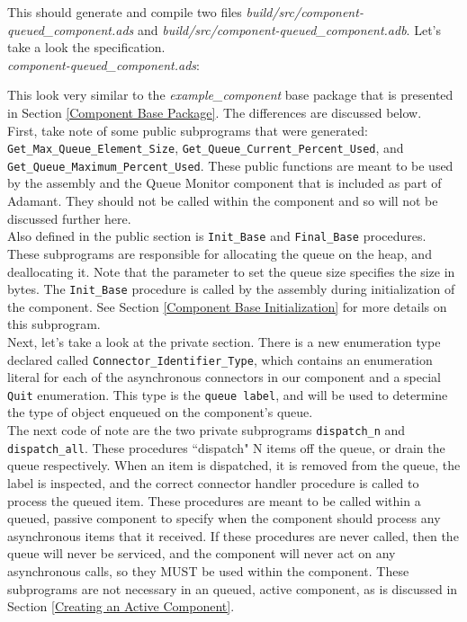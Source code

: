 This should generate and compile two files \textit{build/src/component-queued\_component.ads} and \textit{build/src/component-queued\_component.adb}. Let's take a look the specification. \\

\textit{component-queued\_component.ads}:

This look very similar to the \textit{example\_component} base package that is presented in Section \ref{Component Base Package}. The differences are discussed below. \\

First, take note of some public subprograms that were generated: \texttt{Get\_Max\_Queue\_Element\_Size}, \texttt{Get\_Queue\_Current\_Percent\_Used}, and \texttt{Get\_Queue\_Maximum\_Percent\_Used}. These public functions are meant to be used by the assembly and the Queue Monitor component that is included as part of Adamant. They should not be called within the component and so will not be discussed further here. \\

Also defined in the public section is \texttt{Init\_Base} and \texttt{Final\_Base} procedures. These subprograms are responsible for allocating the queue on the heap, and deallocating it. Note that the parameter to set the queue size specifies the size in bytes. The \texttt{Init\_Base} procedure is called by the assembly during initialization of the component. See Section \ref{Component Base Initialization} for more details on this subprogram. \\

Next, let's take a look at the private section. There is a new enumeration type declared called \texttt{Connector\_Identifier\_Type}, which contains an enumeration literal for each of the asynchronous connectors in our component and a special \texttt{Quit} enumeration. This type is the \texttt{queue label}, and will be used to determine the type of object enqueued on the component's queue. \\

The next code of note are the two private subprograms \texttt{dispatch\_n} and \texttt{dispatch\_all}. These procedures ``dispatch" N items off the queue, or drain the queue respectively. When an item is dispatched, it is removed from the queue, the label is inspected, and the correct connector handler procedure is called to process the queued item. These procedures are meant to be called within a queued, passive component to specify when the component should process any asynchronous items that it received. If these procedures are never called, then the queue will never be serviced, and the component will never act on any asynchronous calls, so they MUST be used within the component. These subprograms are not necessary in an queued, active component, as is discussed in Section \ref{Creating an Active Component}. \\

